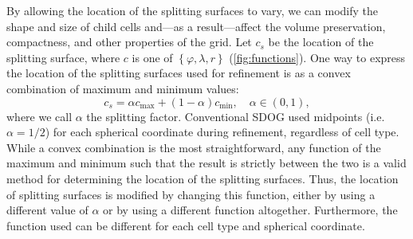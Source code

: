 By allowing the location of the splitting surfaces to vary, we can modify the shape and size of child cells and---as a result---affect the volume preservation, compactness, and other properties of the grid.
Let $c_{s}$ be the location of the splitting surface, where $c$ is one of $\left\lbrace \varphi, \lambda, r \right\rbrace$ (\cref{fig:functions}).
One way to express the location of the splitting surfaces used for refinement is as a convex combination of maximum and minimum values:
%
\begin{equation*}
c_{s} = \alpha c_\mathrm{max} + \left( 1-\alpha \right) c_\mathrm{min}, \quad \alpha \in \left( 0, 1 \right),
\end{equation*}
%
where we call $\alpha$ the splitting factor.
Conventional SDOG used midpoints (i.e. $\alpha = 1/2$) for each spherical coordinate during refinement, regardless of cell type.
While a convex combination is the most straightforward, any function of the maximum and minimum such that the result is strictly between the two is a valid method for determining the location of the splitting surfaces.
Thus, the location of splitting surfaces is modified by changing this function, either by using a different value of $\alpha$ or by using a different function altogether.
Furthermore, the function used can be different for each cell type and spherical coordinate.



